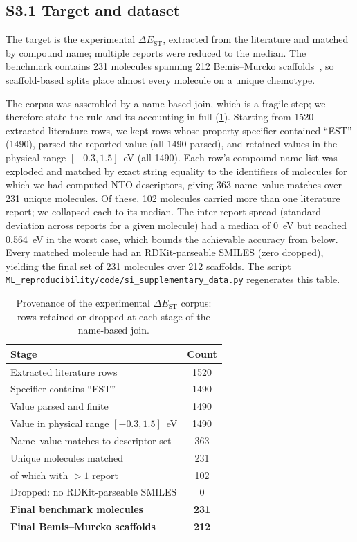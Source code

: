 \documentclass[twoside,twocolumn,9pt]{extarticle}
\begin{document}
\subsection*{S3.1 Target and dataset}
The target is the experimental $\Delta E_\text{ST}$, extracted from the
literature and matched by compound name; multiple reports were reduced to the
median. The benchmark contains \num{231} molecules spanning \num{212}
Bemis--Murcko scaffolds~\cite{Bemis1996}, so scaffold-based splits place almost
every molecule on a unique chemotype.

The corpus was assembled by a name-based join, which is a fragile step; we therefore
state the rule and its accounting in full (\cref{tab:provenance}). Starting from
\num{1520} extracted literature rows, we kept rows whose property specifier
contained ``EST'' (\num{1490}), parsed the reported value (all \num{1490} parsed),
and retained values in the physical range $[-0.3, 1.5]$~eV (all \num{1490}). Each
row's compound-name list was exploded and matched by exact string equality to the
identifiers of molecules for which we had computed NTO descriptors, giving
\num{363} name--value matches over \num{231} unique molecules. Of these,
\num{102} molecules carried more than one literature report; we collapsed each to
its median. The inter-report spread (standard deviation across reports for a given
molecule) had a median of \qty{0}{\electronvolt} but reached
\qty{0.564}{\electronvolt} in the worst case, which bounds the achievable accuracy
from below. Every matched molecule had an RDKit-parseable SMILES (zero dropped),
yielding the final set of \num{231} molecules over \num{212} scaffolds. The script
\texttt{ML\_reproducibility/code/si\_supplementary\_data.py} regenerates this table.

\begin{table}[htbp]
  \centering
  \caption{Provenance of the experimental $\Delta E_\text{ST}$ corpus: rows
    retained or dropped at each stage of the name-based join.}
  \label{tab:provenance}
  \footnotesize
  \begin{tabular}{lc}
    \toprule
    Stage & Count \\
    \midrule
    Extracted literature rows                 & 1520 \\
    Specifier contains ``EST''                & 1490 \\
    Value parsed and finite                   & 1490 \\
    Value in physical range $[-0.3,1.5]$~eV   & 1490 \\
    Name--value matches to descriptor set     & 363 \\
    Unique molecules matched                  & 231 \\
    \quad of which with $>1$ report           & 102 \\
    Dropped: no RDKit-parseable SMILES        & 0 \\
    \midrule
    \textbf{Final benchmark molecules}        & \textbf{231} \\
    \textbf{Final Bemis--Murcko scaffolds}    & \textbf{212} \\
    \bottomrule
  \end{tabular}
\end{table}
\end{document}
